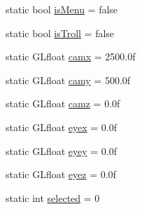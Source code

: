 \begin{DoxyCompactItemize}
static bool \mbox{\hyperlink{class_scene_texture_a659107efe5e192a00336cfdf2240295b}{is\+Menu}} = false
\item 
static bool \mbox{\hyperlink{class_scene_texture_a2b54560296f6bb1cd10a7f62a891641e}{is\+Troll}} = false
\item 
static G\+Lfloat \mbox{\hyperlink{class_scene_texture_ad9c868c99bb6582e0b6c17a6ce7b5c63}{camx}} = 2500.\+0f
\item 
static G\+Lfloat \mbox{\hyperlink{class_scene_texture_a0da47773808d3245e64e9763ff8cb24d}{camy}} = 500.\+0f
\item 
static G\+Lfloat \mbox{\hyperlink{class_scene_texture_aa9a762db75cdf22ffb88ac901557e5b8}{camz}} = 0.\+0f
\item 
static G\+Lfloat \mbox{\hyperlink{class_scene_texture_a802ce92008205ae668aafd73082f8a24}{eyex}} = 0.\+0f
\item 
static G\+Lfloat \mbox{\hyperlink{class_scene_texture_a2a402f0b2d0eeeea92889a61e2ec372c}{eyey}} = 0.\+0f
\item 
static G\+Lfloat \mbox{\hyperlink{class_scene_texture_a886adca6acb15f43797ca32b3a6e3330}{eyez}} = 0.\+0f
\item 
static int \mbox{\hyperlink{class_scene_texture_af6062bdf26eb7625f38d8e2d1508fb60}{selected}} = 0
\end{DoxyCompactItemize}
